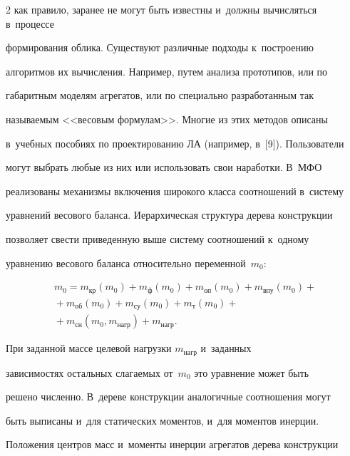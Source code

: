 \begin{multicols}{2}
как правило, заранее не могут быть известны и~должны вы\-чис\-лять\-ся в~процессе 


формирования облика. Существуют различные подходы к~по\-стро\-ению 


алгоритмов их вы\-чис\-ле\-ния. Например, путем анализа прототипов, или по 


габаритным моделям агрегатов, или по специально разработанным так 


называемым <<весовым формулам>>. Многие из этих методов описаны 


в~учебных пособиях по проектированию ЛА (например, в~[9]). Пользователи 


могут выбрать любые из них или использовать свои наработки. В~МФО 


реализованы механизмы включения широкого класса соотношений в~систему 


уравнений весового баланса. Иерархическая структура дерева конструкции 


позволяет свести приведенную выше сис\-те\-му соотношений к~одному 


уравнению весового баланса относительно переменной~$m_0$:


  \begin{multline*}


  m_0=m_{\mathrm{кр}}(m_0) +m_{\mathrm{ф}}(m_0) +


  m_{\mathrm{оп}}(m_0)+ m_{\mathrm{впу}}(m_0)+{}\\


  {}+ m_{\mathrm{об}}(m_0)+ m_{\mathrm{су}}(m_0)+ 


m_{\mathrm{т}}(m_0)+ {}\\


{}+m_{\mathrm{сн}}(m_0, m_{\mathrm{нагр}}) + 


m_{\mathrm{нагр}}.


  \end{multline*}


%


При заданной массе целевой нагрузки $ m_{\mathrm{нагр}}$ и~заданных 


зависимостях остальных слагаемых от~$m_0$ это уравнение может быть 


решено чис\-лен\-но. В~дереве конструкции аналогичные соотношения могут 


быть выписаны и~для статических моментов, и~для моментов инерции. 


Положения цент\-ров масс и~моменты инерции агрегатов дерева конструкции 



\end{multicols}
